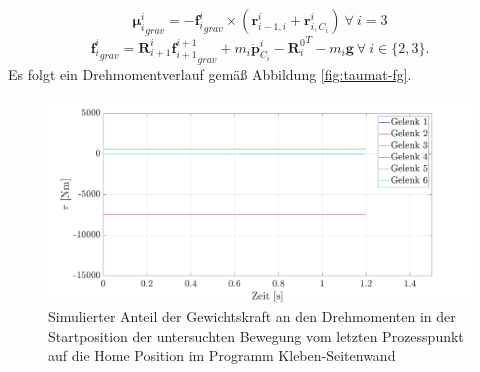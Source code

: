 %
\begin{equation}
	\label{eqn:mugrav}
	{\bm{\mu}^{i}_{i}}_{grav} = -{\bm{f}^{i}_{i}}_{grav} \times \left( \bm{r}^{i}_{i-1,i} + \bm{r}^{i}_{i,C_i} \right) ~\forall ~i = 3
\end{equation}
%
\begin{equation}
	\label{eqn:subfgrav}
	{\bm{f}^{i}_{i}}_{grav} = \bm{R}^{i}_{i+1} {\bm{f}^{i+1}_{i+1}}_{grav} + m_i\ddot{\bm{p}}^{i}_{C_i} - {\bm{R}^0_i}^T - m_i \bm{g} ~\forall ~i \in \{2,3\}.
\end{equation}
%
Es folgt ein Drehmomentverlauf gemäß Abbildung \ref{fig:taumat-fg}. 
%

\begin{figure}[tbph]
	\centering
	\includegraphics[width=1\linewidth]{images/Gewichtskraft}
	\caption{Simulierter Anteil der Gewichtskraft an den Drehmomenten in der Startposition der untersuchten Bewegung vom letzten Prozesspunkt auf die  Home Position im Programm Kleben-Seitenwand}
	\label{fig:gewichtskraft}
\end{figure}
%

